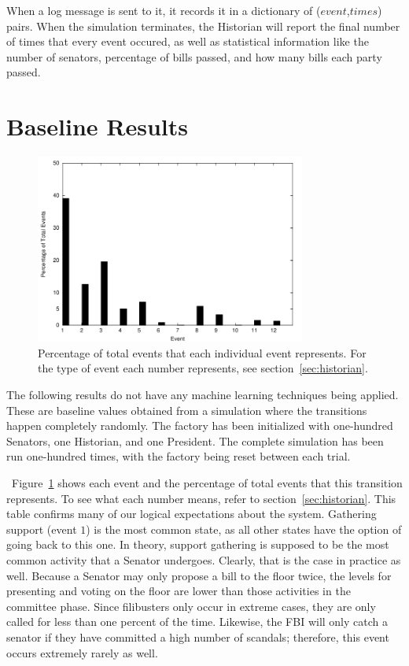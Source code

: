\documentclass{sig-alternate}
\newcommand{\fig}[1]{Figure~\ref{fig:#1}}
\begin{document}
When a log message is sent to it, it records it in a dictionary of ($event$,$times$) pairs. When the simulation terminates, the Historian
will report the final number of times that every event occured, as 
well as statistical information like the number of senators, percentage
of bills passed, and how many bills each party passed. 

\section{Baseline Results}

\begin{figure}[!t]
\begin{center}
\includegraphics[width=3.5in]{all.pdf}
\end{center}
\caption{Percentage of total events that each individual event 
represents. For the type of event each number represents, see section~\ref{sec:historian}.}\label{fig:percents}
\end{figure}

The following results do not have any machine learning techniques 
being applied. These are baseline values obtained from a simulation
where the transitions happen completely randomly. The factory has been
initialized with one-hundred Senators, one Historian, and one President.
The complete simulation has been run one-hundred times, with the factory
being reset between each trial. 

~\fig{percents} shows each event and the percentage of total events that
this transition represents. To see what each number means, refer to 
section~\ref{sec:historian}. This table confirms many of our logical 
expectations about the system. Gathering support (event $1$) is the
most common state, as all other states have the option of going back to
this one. In theory, support gathering is supposed to be the most 
common activity that a Senator undergoes. Clearly, that is the case in 
practice as well. Because a Senator may only propose a bill to the floor
twice, the levels for presenting and voting on the floor are lower
than those activities in the committee phase. Since filibusters only
occur in extreme cases, they are only called for less than one percent
of the time. Likewise, the FBI will only catch a senator if they have committed a high number of scandals; therefore, this event occurs 
extremely rarely as well. 
\end{document}
